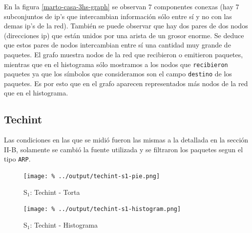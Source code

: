 \documentclass[final,inline,a4paper,narroweqnarray]{ieee}
\begin{document}
  En la figura \ref{marto-casa-3hs-graph} se observan 7 componentes conexas
  (hay 7 subconjuntos de ip's que intercambian información sólo entre sí y
  no con las demas ip's de la red). También se puede observar que hay dos
  pares de dos
  nodos (direcciones ip) que están unidos por una arista de un grosor
  enorme. Se deduce que estos pares de  nodos intercambian entre sí una cantidad
  muy grande de paquetes.
  El grafo muestra nodos de la red que recibieron o emitieron paquetes,
  mientras que en el histograma sólo mostramos a los nodos que
  \texttt{recibieron} paquetes ya que los símbolos que consideramos son el
  campo \texttt{destino} de los paquetes. Es por esto que en el grafo
  aparecen representados más nodos de la red que en el histograma.  

  \subsection{Techint}

  Las condiciones en las que se midió fueron las mismas a la detallada en la
  sección II-B, solamente se cambió la fuente utilizada y se filtraron los
  paquetes segun el tipo \texttt{ARP}.  

    \begin{figure}[H]\begin{center}
      \texttt{[image: \%
      ../output/techint-s1-pie.png]}
      \vspace{-2em}
      \caption{S$_1$: Techint - Torta}
      \label{techint-s1-pie}
    \end{center}\end{figure}

    \begin{figure}[H]\begin{center}
      \texttt{[image: \%
      ../output/techint-s1-histogram.png]}
      \vspace{-2em}
      \caption{S$_1$: Techint - Histograma}
      \label{techint-s1-histogram}
    \end{center}\end{figure}
  
\end{document}
